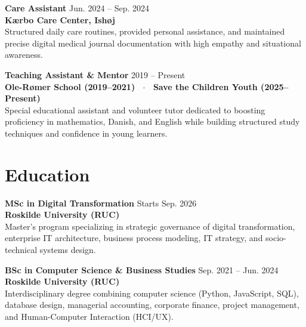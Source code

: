 \documentclass[9.5pt,a4paper]{article}
\begin{document}
\vspace{3pt}

\textbf{\fontsize{9.5}{11.5}\selectfont Care Assistant} \hfill {\fontsize{8.5}{10.5}\selectfont\color{mutedgray}Jun. 2024 -- Sep. 2024} \\
{\fontsize{8.5}{10.5}\selectfont\textbf{\color{accent}Kærbo Care Center, Ishøj}} \\[2pt]
{\fontsize{8.5}{11}\selectfont\color{darkslate}
Structured daily care routines, provided personal assistance, and maintained precise digital medical journal documentation with high empathy and situational awareness.
}

\vspace{3pt}

\textbf{\fontsize{9.5}{11.5}\selectfont Teaching Assistant \& Mentor} \hfill {\fontsize{8.5}{10.5}\selectfont\color{mutedgray}2019 -- Present} \\
{\fontsize{8.5}{10.5}\selectfont\textbf{\color{accent}Ole-Rømer School (2019--2021) \ $\cdot$ \ Save the Children Youth (2025--Present)}} \\[2pt]
{\fontsize{8.5}{11}\selectfont\color{darkslate}
Special educational assistant and volunteer tutor dedicated to boosting proficiency in mathematics, Danish, and English while building structured study techniques and confidence in young learners.
}

\section{Education}

\textbf{\fontsize{9.5}{11.5}\selectfont MSc in Digital Transformation} \hfill {\fontsize{8.5}{10.5}\selectfont\color{mutedgray}Starts Sep. 2026} \\
{\fontsize{8.5}{10.5}\selectfont\textbf{\color{accent}Roskilde University (RUC)}} \\[2pt]
{\fontsize{8.5}{11}\selectfont\color{darkslate}
Master's program specializing in strategic governance of digital transformation, enterprise IT architecture, business process modeling, IT strategy, and socio-technical systems design.
}

\vspace{3pt}

\textbf{\fontsize{9.5}{11.5}\selectfont BSc in Computer Science \& Business Studies} \hfill {\fontsize{8.5}{10.5}\selectfont\color{mutedgray}Sep. 2021 -- Jun. 2024} \\
{\fontsize{8.5}{10.5}\selectfont\textbf{\color{accent}Roskilde University (RUC)}} \\[2pt]
{\fontsize{8.5}{11}\selectfont\color{darkslate}
Interdisciplinary degree combining computer science (Python, JavaScript, SQL), database design, managerial accounting, corporate finance, project management, and Human-Computer Interaction (HCI/UX).
}
\end{document}

